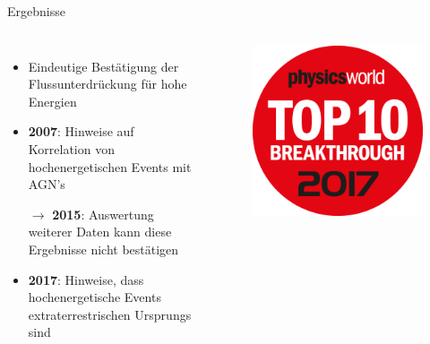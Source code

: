 \documentclass[aspectratio=1610, professionalfonts, 9pt, hyperref={colorlinks=false}]{beamer}
\begin{document}
\begin{frame}{Ergebnisse}
  \begin{columns}
      \begin{itemize}
        \setlength\itemsep{0.5em}
        \item Eindeutige Bestätigung der Flussunterdrückung für hohe Energien
        \item \textbf{2007}: Hinweise auf Korrelation von hochenergetischen Events mit AGN's
        \item[$\rightarrow$] \textbf{2015}: Auswertung weiterer Daten kann diese Ergebnisse nicht bestätigen
        \item \textbf{2017}: Hinweise, dass hochenergetische Events extraterrestrischen Ursprungs sind

      \end{itemize}
        \vspace*{10px}
  
      \begin{figure}
          \centering
          \includegraphics[width=\linewidth]{images/DQyBdvVVQAAgu29.png}
      \end{figure}
  \end{columns}
\end{frame}
\end{document}
